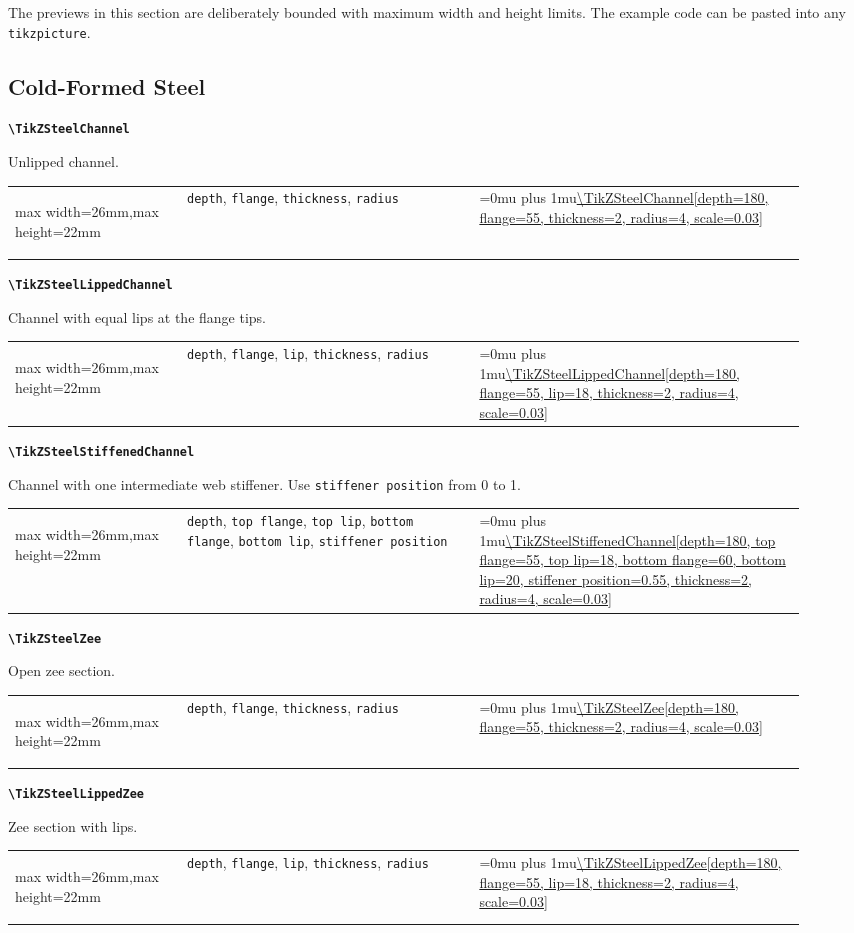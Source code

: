 \documentclass[10pt]{article}
\makeatletter
\newcommand{\command}[1]{\texttt{\textbackslash #1}}
\newcommand{\keyname}[1]{\texttt{#1}}
\newcommand{\CodeInline}[1]{%
  \begingroup
  \ttfamily\scriptsize\raggedright\Urlmuskip=0mu plus 1mu\url{#1}%
  \endgroup
}
\newcommand{\ShapePreview}[1]{%
  \begin{center}
  \begin{adjustbox}{max width=26mm,max height=22mm}
    \begin{tikzpicture}
      #1
    \end{tikzpicture}
  \end{adjustbox}
  \end{center}
}
\newcommand{\ReferenceRow}[6]{%
  \textbf{\command{#1}}\par
  #2\par
  \vspace{2pt}
  \begin{tabular}{@{}p{0.20\linewidth}p{0.34\linewidth}p{0.38\linewidth}@{}}
    #6 & \footnotesize #3 & \CodeInline{#4}
  \end{tabular}
  \par\vspace{4mm}
}
\makeatother
\begin{document}
The previews in this section are deliberately bounded with maximum width and
height limits. The example code can be pasted into any \texttt{tikzpicture}.

\subsection{Cold-Formed Steel}

\ReferenceRow
  {TikZSteelChannel}
  {Unlipped channel.}
  {\keyname{depth}, \keyname{flange}, \keyname{thickness}, \keyname{radius}}
  {\TikZSteelChannel[depth=180, flange=55, thickness=2, radius=4, scale=0.03]}
  {}
  {\ShapePreview{\TikZSteelChannel[depth=180, flange=55, thickness=2, radius=4, scale=0.03]}}

\ReferenceRow
  {TikZSteelLippedChannel}
  {Channel with equal lips at the flange tips.}
  {\keyname{depth}, \keyname{flange}, \keyname{lip}, \keyname{thickness}, \keyname{radius}}
  {\TikZSteelLippedChannel[depth=180, flange=55, lip=18, thickness=2, radius=4, scale=0.03]}
  {}
  {\ShapePreview{\TikZSteelLippedChannel[depth=180, flange=55, lip=18, thickness=2, radius=4, scale=0.03]}}

\ReferenceRow
  {TikZSteelStiffenedChannel}
  {Channel with one intermediate web stiffener. Use \keyname{stiffener position} from 0 to 1.}
  {\keyname{depth}, \keyname{top flange}, \keyname{top lip}, \keyname{bottom flange}, \keyname{bottom lip}, \keyname{stiffener position}}
  {\TikZSteelStiffenedChannel[depth=180, top flange=55, top lip=18, bottom flange=60, bottom lip=20, stiffener position=0.55, thickness=2, radius=4, scale=0.03]}
  {}
  {\ShapePreview{\TikZSteelStiffenedChannel[depth=180, top flange=55, top lip=18, bottom flange=60, bottom lip=20, stiffener position=0.55, thickness=2, radius=4, scale=0.03]}}

\ReferenceRow
  {TikZSteelZee}
  {Open zee section.}
  {\keyname{depth}, \keyname{flange}, \keyname{thickness}, \keyname{radius}}
  {\TikZSteelZee[depth=180, flange=55, thickness=2, radius=4, scale=0.03]}
  {}
  {\ShapePreview{\TikZSteelZee[depth=180, flange=55, thickness=2, radius=4, scale=0.03]}}

\ReferenceRow
  {TikZSteelLippedZee}
  {Zee section with lips.}
  {\keyname{depth}, \keyname{flange}, \keyname{lip}, \keyname{thickness}, \keyname{radius}}
  {\TikZSteelLippedZee[depth=180, flange=55, lip=18, thickness=2, radius=4, scale=0.03]}
  {}
  {\ShapePreview{\TikZSteelLippedZee[depth=180, flange=55, lip=18, thickness=2, radius=4, scale=0.03]}}
\end{document}
